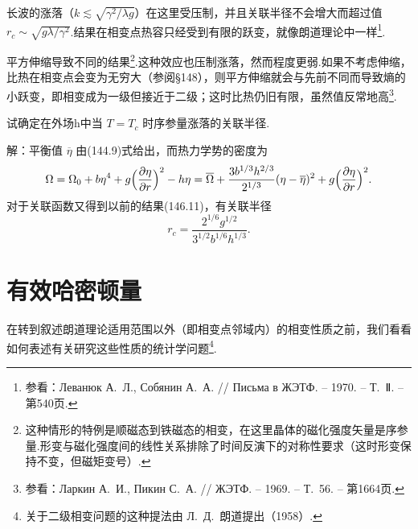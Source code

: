 长波的涨落（$k\lesssim\sqrt{\gamma^2/\lambda g}$）在这里受压制，并且关联半径不会增大而超过值 $r_c\sim\sqrt{g\lambda/\gamma^2}$.结果在相变点热容只经受到有限的跃变，就像朗道理论中一样\footnote{参看：Леванюк А.~Л., Собянин А.~А. // Письма в ЖЭТФ. – 1970. – Т.~Ⅱ. – 第540页.}.

平方伸缩导致不同的结果\footnote{这种情形的特例是顺磁态到铁磁态的相变，在这里晶体的磁化强度矢量是序参量.形变与磁化强度间的线性关系排除了时间反演下的对称性要求（这时形变保持不变，但磁矩变号）.}.这种效应也压制涨落，然而程度更弱.如果不考虑伸缩，比热在相变点会变为无穷大（参阅§148），则平方伸缩就会与先前不同而导致熵的小跃变，即相变成为一级但接近于二级；这时比热仍旧有限，虽然值反常地高\footnote{参看：Ларкин А.~И., Пикин С.~А. // ЖЭТФ. – 1969. – Т.~56. – 第1664页.}.

\begin{xiti}

试确定在外场h中当 $T=T_c$ 时序参量涨落的关联半径.

解：平衡值 $\overline{\eta}$ 由(144.9)式给出，而热力学势的密度为
\begin{equation*}
  \Omega=\Omega_0+b\eta^4+g\Bigl(\frac{\partial\eta}{\partial r}\Bigr)^2-h\eta
  =\overline{\Omega}
  +\frac{3b^{1/3}h^{2/3}}{2^{1/3}}(\eta-\overline{\eta})^2
  +g\Bigl(\frac{\partial\eta}{\partial r}\Bigr)^2.
\end{equation*}
对于关联函数又得到以前的结果(146.11)，有关联半径
\begin{equation*}
  r_c=\frac{2^{1/6}g^{1/2}}{3^{1/2}b^{1/6}h^{1/3}}.
\end{equation*}

\end{xiti}

\section{有效哈密顿量}

在转到叙述朗道理论适用范围以外（即相变点邻域内）的相变性质之前，我们看看如何表述有关研究这些性质的统计学问题\footnote{关于二级相变问题的这种提法由 Л.~Д.~朗道提出（1958）.}.

